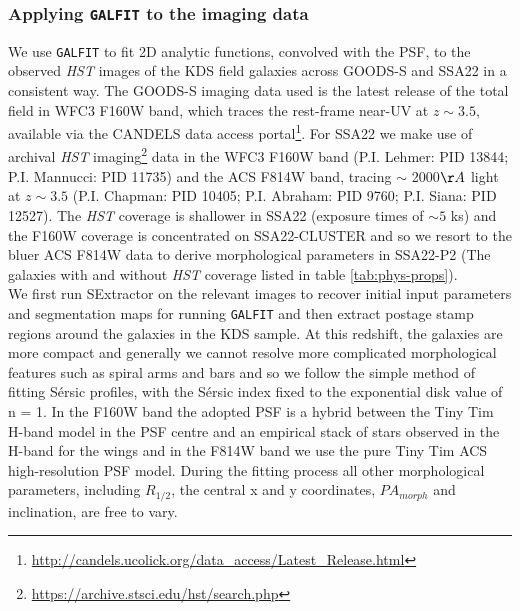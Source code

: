 \documentclass[fleqn,usenatbib]{mn2e}
\newcommand{\Sers}{S\'{e}rsic }
\begin{document}
\subsubsection{Applying {\tt GALFIT} to the imaging data}\label{subsubsec:galfitting}
We use {\tt GALFIT} \citep{Peng2010_galfit} to fit 2D analytic functions, convolved with the PSF, to the observed {\em HST} images of the KDS field galaxies across GOODS-S and SSA22 in a consistent way.
The GOODS-S imaging data used is the latest release of the total field in WFC3 F160W band, which traces the rest-frame near-UV at $z \sim 3.5$, available via the CANDELS \citep{Grogin2011,Koekemoer2011} data access portal\footnote{\url{http://candels.ucolick.org/data_access/Latest_Release.html}}.
For SSA22 we make use of archival {\em HST} imaging\footnote{\url{https://archive.stsci.edu/hst/search.php}} data in the WFC3 F160W band (P.I. Lehmer: PID 13844; P.I. Mannucci: PID 11735) and the ACS F814W band, tracing $\sim$ 2000$\AA$ light at $z\sim 3.5$ (P.I. Chapman: PID 10405; P.I. Abraham: PID 9760; P.I. Siana: PID 12527).
The {\em HST} coverage is shallower in SSA22 (exposure times of $\sim 5$ ks) and the F160W coverage is concentrated on SSA22-CLUSTER and so we resort to the bluer ACS F814W data to derive morphological parameters in SSA22-P2 (The galaxies with and without {\em HST} coverage listed in table \ref{tab:phys-props}). \\

We first run SExtractor \citep{Bertin1996} on the relevant images to recover initial input parameters and segmentation maps for running {\tt GALFIT} and then extract postage stamp regions around the galaxies in the KDS sample.
At this redshift, the galaxies are more compact and generally we cannot resolve more complicated morphological features such as spiral arms and bars and so we follow the simple method of fitting \Sers profiles, with the \Sers index fixed to the exponential disk value of n = 1.
In the F160W band the adopted PSF is a hybrid between the Tiny Tim H-band model \citep{Krist2011} in the PSF centre and an empirical stack of stars observed in the H-band for the wings \citep{VanderWel2012} and in the F814W band we use the pure Tiny Tim ACS high-resolution PSF model.
During the fitting process all other morphological parameters, including $R_{1/2}$, the central x and y coordinates, $PA_{morph}$ and inclination, are free to vary.
\end{document}
